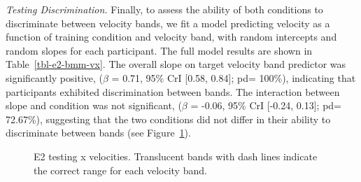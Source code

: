 \documentclass[
  12pt,
  letterpaper,
]{article}
\begin{document}
\emph{Testing Discrimination.} Finally, to assess the ability of both
conditions to discriminate between velocity bands, we fit a model
predicting velocity as a function of training condition and velocity
band, with random intercepts and random slopes for each participant. The
full model results are shown in Table~\ref{tbl-e2-bmm-vx}. The overall
slope on target velocity band predictor was significantly positive,
(\(\beta\) = 0.71, 95\% CrI {[}0.58, 0.84{]}; pd= 100\%), indicating
that participants exhibited discrimination between bands. The
interaction between slope and condition was not significant, (\(\beta\)
= -0.06, 95\% CrI {[}-0.24, 0.13{]}; pd= 72.67\%), suggesting that the
two conditions did not differ in their ability to discriminate between
bands (see Figure~\ref{fig-e2-test-vx}).

\begin{figure}


\caption{\label{fig-e2-test-vx}E2 testing x velocities. Translucent
bands with dash lines indicate the correct range for each velocity
band.}

\end{figure}%
\end{document}
